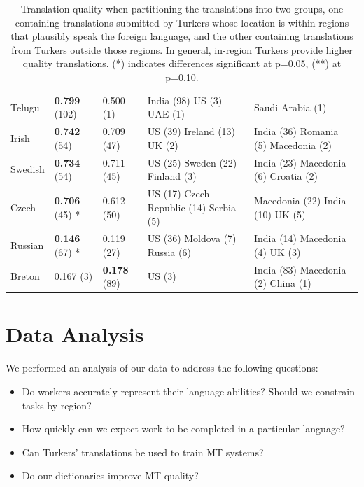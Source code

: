 \documentclass[11pt]{article}
\begin{document}
\begin{table}
\begin{center}
\begin{tabular}{lllll}
Telugu & \textbf{0.799} (102) & 0.500 (1) & India (98) US (3) UAE (1)  & Saudi Arabia (1)  \\
Irish & \textbf{0.742} (54) & 0.709 (47) & US (39) Ireland (13) UK (2)  & India (36) Romania (5) Macedonia (2)  \\
Swedish & \textbf{0.734} (54) & 0.711 (45) & US (25) Sweden (22) Finland (3)  & India (23) Macedonia (6) Croatia (2)  \\
Czech & \textbf{0.706} (45) * & 0.612 (50) & US (17) Czech Republic (14) Serbia (5)  & Macedonia (22) India (10) UK (5)  \\
Russian & \textbf{0.146} (67) * & 0.119 (27) & US (36) Moldova (7) Russia (6)  & India (14) Macedonia (4) UK (3)  \\
Breton & 0.167 (3) & \textbf{0.178} (89) & US (3)  & India (83) Macedonia (2) China (1) \\
\hline\hline
\end{tabular}
\normalsize
\end{center}
\caption{Translation quality when partitioning the translations into two groups, one containing translations submitted by Turkers whose location is within regions that plausibly speak the foreign language, and the other containing translations from Turkers outside those regions. In general, in-region Turkers provide higher quality translations. (*) indicates differences significant at p=0.05, (**) at p=0.10.} \label{region-summary}
\end{table}

\section{Data Analysis} \label{sec:data-analysis}

We performed an analysis of our data to address the following questions:
\begin{itemize}
\item Do workers accurately represent their language abilities?  Should we constrain tasks by region? 
\item How quickly can we expect work to be completed in a particular language? 
\item Can Turkers' translations be used to train MT systems? 
\item Do our dictionaries improve MT quality?
\end{itemize}
\end{document}
